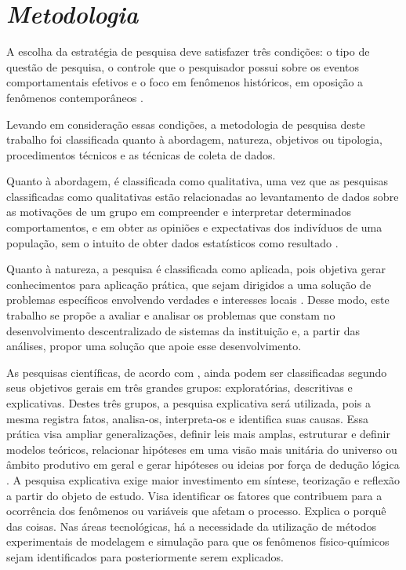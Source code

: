 \section{\textit{Metodologia}}

A escolha da estratégia de pesquisa deve satisfazer três condições: o tipo de questão de pesquisa, o controle que o pesquisador possui sobre os eventos comportamentais efetivos e o foco em fenômenos históricos, em oposição a fenômenos contemporâneos \cite{yin2001estudo}.

Levando em consideração essas condições, a metodologia de pesquisa deste trabalho foi classificada quanto à abordagem, natureza, objetivos ou tipologia, procedimentos técnicos e as técnicas de coleta de dados.

Quanto à abordagem, é classificada como qualitativa, uma vez que as pesquisas
classificadas como qualitativas estão relacionadas ao levantamento de dados sobre as motivações de um grupo em compreender e interpretar determinados comportamentos, e em obter as opiniões e expectativas dos indivíduos de uma população, sem o intuito de obter dados estatísticos como resultado  \cite{gunther2006pesquisa,moresi2003metodologia}.

Quanto à natureza, a pesquisa é classificada como aplicada, pois objetiva gerar conhecimentos para aplicação prática, que sejam dirigidos a uma solução de problemas específicos envolvendo verdades e interesses locais \cite{gil2002}. Desse modo, este trabalho se propõe a avaliar e analisar os problemas que constam no desenvolvimento descentralizado de sistemas da instituição e, a partir das análises, propor uma solução que apoie esse desenvolvimento.

As pesquisas científicas, de acordo com , ainda podem ser classificadas segundo seus objetivos gerais em três grandes grupos: exploratórias, descritivas e explicativas. Destes três grupos, a pesquisa explicativa será utilizada, pois a mesma registra fatos, analisa-os, interpreta-os e identifica suas causas. Essa prática visa ampliar generalizações, definir leis mais amplas, estruturar e definir modelos teóricos, relacionar hipóteses em uma visão mais unitária do universo ou âmbito produtivo em geral e gerar hipóteses ou ideias por força de dedução lógica \cite{lakatos1991metodologia}. A pesquisa explicativa exige maior investimento em síntese, teorização e reflexão a partir do objeto de estudo. Visa identificar os fatores que contribuem para a ocorrência dos fenômenos ou variáveis que afetam o processo. Explica o porquê das coisas. Nas áreas tecnológicas, há a necessidade da utilização de métodos experimentais de modelagem e simulação para que os fenômenos físico-químicos sejam identificados para posteriormente serem explicados.

